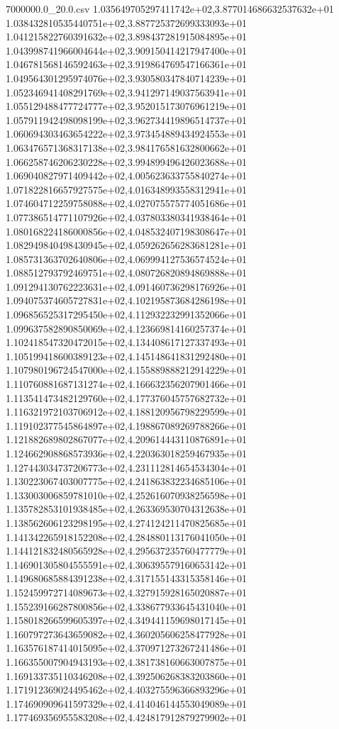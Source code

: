 \begin{filecontents*}{7000000.0_20.0.csv}
1.035649705297411742e+02,3.877014686632537632e+01
1.038432810535440751e+02,3.887725372699333093e+01
1.041215822760391632e+02,3.898437281915084895e+01
1.043998741966004644e+02,3.909150414217947400e+01
1.046781568146592463e+02,3.919864769547166361e+01
1.049564301295974076e+02,3.930580347840714239e+01
1.052346941408291769e+02,3.941297149037563941e+01
1.055129488477724777e+02,3.952015173076961219e+01
1.057911942498098199e+02,3.962734419896514737e+01
1.060694303463654222e+02,3.973454889434924553e+01
1.063476571368317138e+02,3.984176581632800662e+01
1.066258746206230228e+02,3.994899496426023688e+01
1.069040827971409442e+02,4.005623633755840274e+01
1.071822816657927575e+02,4.016348993558312941e+01
1.074604712259758088e+02,4.027075575774051686e+01
1.077386514771107926e+02,4.037803380341938464e+01
1.080168224186000856e+02,4.048532407198308647e+01
1.082949840498430945e+02,4.059262656283681281e+01
1.085731363702640806e+02,4.069994127536574524e+01
1.088512793792469751e+02,4.080726820894869888e+01
1.091294130762223631e+02,4.091460736298176926e+01
1.094075374605727831e+02,4.102195873684286198e+01
1.096856525317295450e+02,4.112932232991352066e+01
1.099637582890850069e+02,4.123669814160257374e+01
1.102418547320472015e+02,4.134408617127337493e+01
1.105199418600389123e+02,4.145148641831292480e+01
1.107980196724547000e+02,4.155889888212914229e+01
1.110760881687131274e+02,4.166632356207901466e+01
1.113541473482129760e+02,4.177376045757682732e+01
1.116321972103706912e+02,4.188120956798229599e+01
1.119102377545864897e+02,4.198867089269788266e+01
1.121882689802867077e+02,4.209614443110876891e+01
1.124662908868573936e+02,4.220363018259467935e+01
1.127443034737206773e+02,4.231112814654534304e+01
1.130223067403007775e+02,4.241863832234685106e+01
1.133003006859781010e+02,4.252616070938256598e+01
1.135782853101938485e+02,4.263369530704312638e+01
1.138562606123298195e+02,4.274124211470825685e+01
1.141342265918152208e+02,4.284880113176041050e+01
1.144121832480565928e+02,4.295637235760477779e+01
1.146901305804555591e+02,4.306395579160653142e+01
1.149680685884391238e+02,4.317155143315358146e+01
1.152459972714089673e+02,4.327915928165020887e+01
1.155239166287800856e+02,4.338677933645431040e+01
1.158018266599605397e+02,4.349441159698017145e+01
1.160797273643659082e+02,4.360205606258477928e+01
1.163576187414015095e+02,4.370971273267241486e+01
1.166355007904943193e+02,4.381738160663007875e+01
1.169133735110346208e+02,4.392506268383203860e+01
1.171912369024495462e+02,4.403275596366893296e+01
1.174690909641597329e+02,4.414046144553049089e+01
1.177469356955583208e+02,4.424817912879279902e+01

\end{filecontents*}

